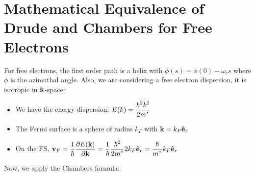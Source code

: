 \section{Mathematical Equivalence of Drude and Chambers for Free Electrons}
\label{sec:equivalence}
For free electrons, the first order path is a helix with $\phi(s) = \phi(0) - \omega_c s$
where $\phi$ is the azimuthal angle. Also, we are considering a free electron dispersion, it is
isotropic in $\vb{k}$-space:
\begin{itemize}
	\item We have the energy dispersion: $E(k) = {\displaystyle\frac{\displaystyle \hbar^2k^2}{\displaystyle 2m^*}}$
	\item The Fermi surface is a sphere of radius $k_F$ with $\vb{k} = k_F\vu{e}_r$
	\item On the FS, $\vb{v}_F = {\displaystyle\frac{\displaystyle 1}{\displaystyle \hbar}}{\displaystyle\frac{\displaystyle \partial E(\vb{k})}{\displaystyle \partial\vb{k}}} = {\displaystyle\frac{\displaystyle 1}{\displaystyle \hbar}}{\displaystyle\frac{\displaystyle \hbar^2}{\displaystyle 2m^*}}2k_F\vu{e}_r = {\displaystyle\frac{\displaystyle \hbar}{\displaystyle m^*}}k_F\vu{e}_r$
\end{itemize} 
Now, we apply the Chambers formula:

